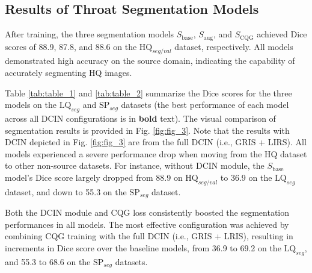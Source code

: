 \subsection{Results of Throat Segmentation Models}
After training, the three segmentation models $S_{\mathrm{base}}$, $S_{\mathrm{aug}}$, and $S_{\mathrm{CQG}}$ achieved Dice scores of 88.9, 87.8, and 88.6 on the $\mathrm{HQ}_{seg/val}$ dataset, respectively. 
All models demonstrated high accuracy on the source domain, indicating the capability of accurately segmenting HQ images. 

Table \ref{tab:table_1} and \ref{tab:table_2} summarize the Dice scores for the three models on the $\mathrm{LQ}_{seg}$ and $\mathrm{SP}_{seg}$ datasets (the best performance of each model across all DCIN configurations is in \textbf{bold} text). 
The visual comparison of segmentation results is provided in Fig. \ref{fig:fig_3}. 
Note that the results with DCIN depicted in Fig. \ref{fig:fig_3} are from the full DCIN (i.e., GRIS + LIRS). 
All models experienced a severe performance drop when moving from the HQ dataset to other non-source datasets. 
For instance, without DCIN module, the $S_{\mathrm{base}}$ model's Dice score largely dropped from 88.9 on $\mathrm{HQ}_{seg/val}$ to 36.9 on the $\mathrm{LQ}_{seg}$ dataset, and down to 55.3 on the $\mathrm{SP}_{seg}$ dataset. 

Both the DCIN module and CQG loss consistently boosted the segmentation performances in all models. 
The most effective configuration was achieved by combining CQG training with the full DCIN (i.e., GRIS + LRIS), resulting in increments in Dice score over the baseline models, from 36.9 to 69.2 on the $\mathrm{LQ}_{seg}$, and 55.3 to 68.6 on the $\mathrm{SP}_{seg}$ datasets. 

